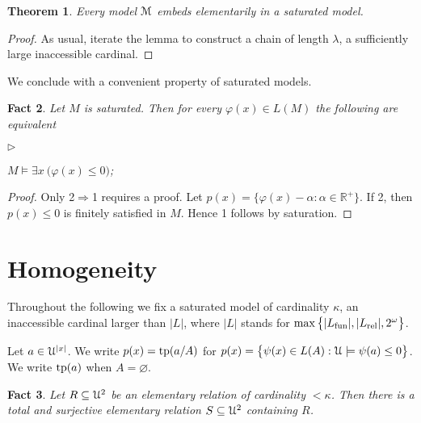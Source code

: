 \documentclass[12pt,letterpaper,oneside,reqno]{amsart}
\newcommand{\mylabel}[1]{{#1}\hfill}
\renewenvironment{itemize}
  {\begin{list}{$\triangleright$}{%
   \setlength{\parskip}{0mm}
   \setlength{\topsep}{.2\baselineskip}
   \setlength{\rightmargin}{0mm}
   \setlength{\listparindent}{0mm}
   \setlength{\itemindent}{0mm}
   \setlength{\labelwidth}{3ex}
   \setlength{\itemsep}{.2\baselineskip}
   \setlength{\parsep}{.2\baselineskip}
   \setlength{\partopsep}{0mm}
   \setlength{\labelsep}{1ex}
   \setlength{\leftmargin}{\labelwidth+\labelsep}
   \let\makelabel\mylabel}}{%
   \end{list}}
\theoremstyle{plain}
\newtheorem{theorem}{Theorem}%
\newtheorem{fact}[theorem]{Fact}
\theoremstyle{remark}
\renewcommand*{\emph}[1]{%
   \smash{\tikz[baseline]\node[rectangle, fill=olive!25, rounded corners, inner xsep=0.5ex, inner ysep=0.2ex, anchor=base, minimum height = 2.7ex]{#1};}}
\begin{document}
\begin{theorem}
  Every model ${\EuScript M}$ embeds elementarily in a saturated model.
\end{theorem}

\begin{proof}
  As usual, iterate the lemma to construct a chain of length $\lambda$, a sufficiently large inaccessible cardinal.
\end{proof}

We conclude with a convenient property of saturated models.

\begin{fact}\label{fact_existential}
  Let $M$ is saturated.
  Then for every $\varphi(x)\in L(M)$ the following are equivalent
  \begin{itemize}
    \item[1.] $M\models\exists x\ \big(\varphi(x)\le0\big)$;
    \item[2.] 
  \end{itemize}
\end{fact}
\begin{proof}
  Only 2$\Rightarrow$1 requires a proof.
  Let $p(x)=\{\varphi(x)-\alpha: \alpha\in{\mathds R}^+\}$.
  If 2, then $p(x)\le0$ is finitely satisfied in $M$.
  Hence 1 follows by saturation.
\end{proof}

\section{Homogeneity}

Throughout the following we fix a saturated model \emph{$\EuScript U$\/} of cardinality $\kappa$, an inaccessible cardinal larger than $|L|$, where $|L|$ stands for $\max\big\{|L_{\rm fun}|,|L_{\rm rel}|,2^\omega\big\}$.

Let $a\in{\EuScript U}^{|x|}$.
We write $p(x)={\rm tp}(a/A)$ for $p(x)=\big\{\psi(x)\in L(A):{\EuScript U}\models \psi(a)\le0\big\}$.
We write ${\rm tp}(a)$ when $A=\varnothing$.

\begin{fact}
  Let $R\subseteq{\EuScript U}^2$ be an elementary relation of cardinality $<\kappa$.
  Then there is a total and surjective elementary relation $S\subseteq{\EuScript U}^2$ containing $R$.
\end{fact}
\end{document}
